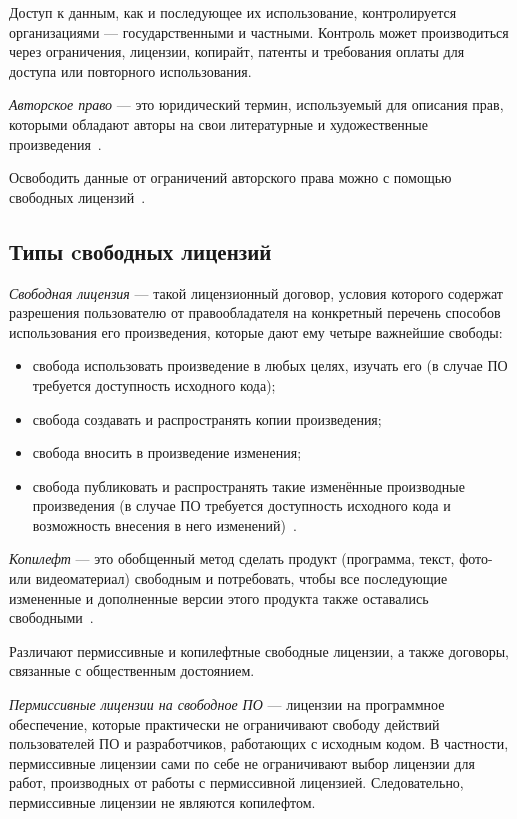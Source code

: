 Доступ к данным, как и последующее их использование, контролируется
организациями --- государственными и частными. 
Контроль может производиться через ограничения, лицензии, копирайт, патенты и требования оплаты
для доступа или повторного использования.

\textit{Авторское право} --- это юридический термин, используемый для описания прав,
которыми обладают авторы на свои литературные и художественные произведения~\cite{wipo_copyright}. 

Освободить данные от ограничений авторского права можно с помощью свободных
лицензий~\cite{wiki_opendata}.


\subsection{Типы cвободных лицензий}

\textit{Свободная лицензия} --- такой лицензионный договор,
 условия которого содержат разрешения пользователю от правообладателя
на конкретный перечень способов использования его произведения, которые дают ему четыре важнейшие свободы:

\begin{itemize}
\item  
  свобода использовать произведение в любых целях, изучать его (в случае ПО требуется доступность исходного кода);
\item
  свобода создавать и распространять копии произведения;
\item
  свобода вносить в произведение изменения;
\item
  свобода публиковать и распространять такие изменённые производные произведения (в случае ПО требуется доступность
  исходного кода и возможность внесения в него изменений)~\cite{wiki_free_license}.
\end{itemize}

\textit{Копилефт} --- это обобщенный метод сделать продукт
(программа, текст, фото- или видеоматериал) свободным и потребовать,
чтобы все последующие измененные и дополненные версии этого продукта также оставались свободными~\cite{gnu_copyleft}.

Различают пермиссивные и копилефтные свободные лицензии, а также договоры, связанные с общественным достоянием.

\textit{Пермиссивные лицензии на свободное ПО} --- лицензии на программное обеспечение,
которые практически не ограничивают свободу действий пользователей ПО и разработчиков,
работающих с исходным кодом.
В частности, пермиссивные лицензии сами по себе не ограничивают выбор лицензии для работ,
производных от работы с пермиссивной лицензией. Следовательно, пермиссивные лицензии не являются копилефтом.

